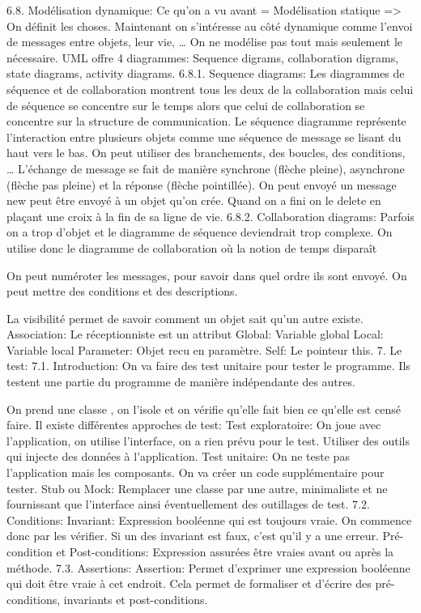 6.8. Modélisation dynamique:
Ce qu’on a vu avant = Modélisation statique => On définit les choses.
Maintenant on s’intéresse au côté dynamique comme l’envoi de messages entre objets, leur vie, …
On ne modélise pas tout mais seulement le nécessaire.
UML offre 4 diagrammes: Sequence digrams, collaboration digrams, state diagrams, activity diagrams.
6.8.1. Sequence diagrams:
Les diagrammes de séquence et de collaboration montrent tous les deux de la collaboration mais celui de séquence se concentre sur le temps alors que celui de collaboration se concentre sur la structure de communication.
Le séquence diagramme représente l'interaction entre plusieurs objets comme une séquence de message se lisant du haut vers le bas.
On peut utiliser des branchements, des boucles, des conditions, …
L’échange de message se fait de manière synchrone (flèche pleine), asynchrone (flèche pas pleine) et la réponse (flèche pointillée).
On peut envoyé un message new peut être envoyé à un objet qu’on crée. Quand on a fini on le delete en plaçant une croix à la fin de sa ligne de vie.
6.8.2. Collaboration diagrams:
Parfois on a trop d’objet et le diagramme de séquence deviendrait trop complexe.
On utilise donc le diagramme de collaboration où la notion de temps disparaît

On peut numéroter les messages, pour savoir dans quel ordre ils sont envoyé.
On peut mettre des conditions et des descriptions.

La visibilité permet de savoir comment un objet sait qu’un autre existe.
Association: Le réceptionniste est un attribut
Global: Variable global
Local: Variable local
Parameter: Objet recu en paramètre.
Self: Le pointeur this.
7. Le test:
7.1. Introduction:
On va faire des test unitaire pour tester le programme. Ils testent une partie du programme de manière indépendante des autres.

On prend une classe , on l’isole et on vérifie qu’elle fait bien ce qu’elle est censé faire.
Il existe différentes approches de test:
Test exploratoire: On joue avec l’application, on utilise l’interface, on a rien prévu pour le test.
Utiliser des outils qui injecte des données à l’application.
Test unitaire: On ne teste pas l’application mais les composants. On va créer un code supplémentaire pour tester.
Stub ou Mock: Remplacer une classe par une autre, minimaliste et ne fournissant que l’interface ainsi éventuellement des outillages de test.
7.2. Conditions:
Invariant: Expression booléenne qui est toujours vraie. On commence donc par les vérifier. Si un des invariant est faux, c’est qu’il y a une erreur.
Pré-condition et Post-conditions: Expression assurées être vraies avant ou après la méthode.
7.3. Assertions:
Assertion: Permet d’exprimer une expression booléenne qui doit être vraie à cet endroit.
Cela permet de formaliser et d’écrire des pré-conditions, invariants et post-conditions.

